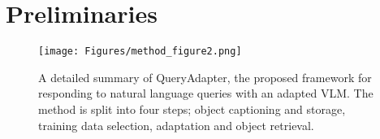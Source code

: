 \section{Preliminaries}

\begin{figure}[!t]
\centering
\texttt{[image: Figures/method\_figure2.png]}
\caption{A detailed summary of QueryAdapter, the proposed framework for responding to natural language queries with an adapted VLM. The method is split into four steps; object captioning and storage, training data selection, adaptation and object retrieval.
}
\vspace{-1.5em}
\label{method_figure}
\end{figure}

